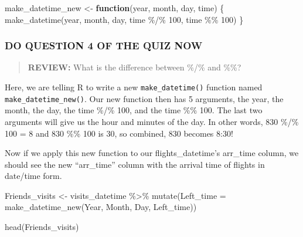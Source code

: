 \documentclass[
]{book}
\newenvironment{Shaded}{\begin{snugshade}}{\end{snugshade}}
\newcommand{\AttributeTok}[1]{\textcolor[rgb]{0.77,0.63,0.00}{#1}}
\newcommand{\ControlFlowTok}[1]{\textcolor[rgb]{0.13,0.29,0.53}{\textbf{#1}}}
\newcommand{\DecValTok}[1]{\textcolor[rgb]{0.00,0.00,0.81}{#1}}
\newcommand{\FunctionTok}[1]{\textcolor[rgb]{0.00,0.00,0.00}{#1}}
\newcommand{\NormalTok}[1]{#1}
\newcommand{\OtherTok}[1]{\textcolor[rgb]{0.56,0.35,0.01}{#1}}
\newcommand{\SpecialCharTok}[1]{\textcolor[rgb]{0.00,0.00,0.00}{#1}}
\begin{document}
\begin{Shaded}
\begin{Highlighting}[]
\NormalTok{make\_datetime\_new }\OtherTok{\textless{}{-}} \ControlFlowTok{function}\NormalTok{(year, month, day, time) \{}
  \FunctionTok{make\_datetime}\NormalTok{(year, month, day, time }\SpecialCharTok{\%/\%} \DecValTok{100}\NormalTok{, time }\SpecialCharTok{\%\%} \DecValTok{100}\NormalTok{)}
\NormalTok{\}}
\end{Highlighting}
\end{Shaded}

\hypertarget{do-question-4-of-the-quiz-now-2}{%
\subsubsection{DO QUESTION 4 OF THE QUIZ NOW}\label{do-question-4-of-the-quiz-now-2}}

\begin{quote}
\textbf{REVIEW:} What is the difference between \%/\% and \%\%?
\end{quote}

Here, we are telling R to write a new \texttt{make\_datetime()} function named \texttt{make\_datetime\_new()}. Our new function then has 5 arguments, the year, the month, the day, the time \%/\% 100, and the time \%\% 100. The last two arguments will give us the hour and minutes of the day. In other words, 830 \%/\% 100 = 8 and 830 \%\% 100 is 30, so combined, 830 becomes 8:30!

Now if we apply this new function to our flights\_datetime's arr\_time column, we should see the new ``arr\_time'' column with the arrival time of flights in date/time form.

\begin{Shaded}
\begin{Highlighting}[]
\NormalTok{Friends\_visits }\OtherTok{\textless{}{-}}\NormalTok{ visits\_datetime }\SpecialCharTok{\%\textgreater{}\%} 
    \FunctionTok{mutate}\NormalTok{(}\AttributeTok{Left\_time =} \FunctionTok{make\_datetime\_new}\NormalTok{(Year, Month, Day, Left\_time))}
\end{Highlighting}
\end{Shaded}

\begin{Shaded}
\begin{Highlighting}[]
\FunctionTok{head}\NormalTok{(Friends\_visits)}
\end{Highlighting}
\end{Shaded}
\end{document}
